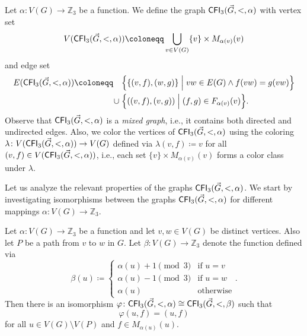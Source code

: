 \documentclass{theoretics}
\newcommand{\ZZ}{{\mathbb Z}}
\newcommand{\Bigmid}{\;\Big|\;}
\newcommand{\CFI}{{\sf CFI}}
\begin{document}
Let $\alpha\colon V(G) \to \ZZ_3$ be a function.
We define the graph $\CFI_3(\vec{G},<,\alpha)$ with vertex set
\[V(\CFI_3(\vec{G},<,\alpha)) \coloneqq \bigcup_{v \in V(G)} \{v\} \times M_{\alpha(v)}(v)\]
and edge set
\begin{align*}
 E(\CFI_3(\vec{G},<,\alpha)) \coloneqq \quad  &\Big\{\{(v,f),(w,g)\} \Bigmid vw \in E(G) \wedge f(vw) = g(vw)\Big\}\\
                                       \cup\; &\Big\{((v,f),(v,g)) \Bigmid (f,g) \in F_{\alpha(v)}(v)\Big\}.
\end{align*}
Observe that $\CFI_3(\vec{G},<,\alpha)$ is a \emph{mixed graph}, i.e., it contains both directed and undirected edges.
Also, we color the vertices of $\CFI_3(\vec{G},<,\alpha)$ using the coloring $\lambda\colon V(\CFI_3(\vec{G},<,\alpha)) \to V(G)$ defined via $\lambda(v,f) \coloneqq v$ for all $(v,f) \in V(\CFI_3(\vec{G},<,\alpha))$, i.e., each set $\{v\} \times M_{\alpha(v)}(v)$ forms a color class under $\lambda$.

Let us analyze the relevant properties of the graphs $\CFI_3(\vec{G},<,\alpha)$.
We start by investigating isomorphisms between the graphs $\CFI_3(\vec{G},<,\alpha)$ for different mappings $\alpha\colon V(G) \to \ZZ_3$.

\begin{lemma}
 \label{lem:twist-along-path}
 Let $\alpha\colon V(G) \to \ZZ_3$ be a function and let $v,w \in V(G)$ be distinct vertices.
 Also let $P$ be a path from $v$ to $w$ in $G$.
 Let $\beta\colon V(G) \to \ZZ_3$ denote the function defined via
 \[\beta(u) \coloneqq \begin{cases}
                       \alpha(u) + 1 \pmod{3} &\text{if } u = v\\
                       \alpha(u) - 1 \pmod{3} &\text{if } u = w\\
                       \alpha(u)              &\text{otherwise}
                      \end{cases}.\]
 Then there is an isomorphism $\varphi\colon \CFI_3(\vec{G},<,\alpha) \cong \CFI_3(\vec{G},<,\beta)$ such that
 \[\varphi(u,f) = (u,f)\]
 for all $u \in V(G) \setminus V(P)$ and $f \in M_{\alpha(u)}(u)$.
\end{lemma}
\end{document}
